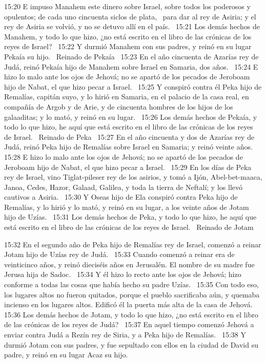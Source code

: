 15:20 E impuso Manahem este dinero sobre Israel, sobre todos los poderosos y opulentos; de cada uno cincuenta siclos de plata,  para dar al rey de Asiria; y el rey de Asiria se volvió, y no se detuvo allí en el país.  
15:21 Los demás hechos de Manahem, y todo lo que hizo, ¿no está escrito en el libro de las crónicas de los reyes de Israel?  
15:22 Y durmió Manahem con sus padres, y reinó en su lugar Pekaía su hijo.  
Reinado de Pekaía  
15:23 En el año cincuenta de Azarías rey de Judá, reinó Pekaía hijo de Manahem sobre Israel en Samaria, dos años.  
15:24 E hizo lo malo ante los ojos de Jehová; no se apartó de los pecados de Jeroboam hijo de Nabat, el que hizo pecar a Israel.  
15:25 Y conspiró contra él Peka hijo de Remalías, capitán suyo, y lo hirió en Samaria, en el palacio de la casa real, en compañía de Argob y de Arie, y de cincuenta hombres de los hijos de los galaaditas; y lo mató, y reinó en su lugar.  
15:26 Los demás hechos de Pekaía, y todo lo que hizo, he aquí que está escrito en el libro de las crónicas de los reyes de Israel.  
Reinado de Peka  
15:27 En el año cincuenta y dos de Azarías rey de Judá, reinó Peka hijo de Remalías sobre Israel en Samaria; y reinó veinte años.  
15:28 E hizo lo malo ante los ojos de Jehová; no se apartó de los pecados de Jeroboam hijo de Nabat, el que hizo pecar a Israel.  
15:29 En los días de Peka rey de Israel, vino Tiglat-pileser rey de los asirios, y tomó a Ijón, Abel-bet-maaca, Janoa, Cedes, Hazor, Galaad, Galilea, y toda la tierra de Neftalí; y los llevó cautivos a Asiria.  
15:30 Y Oseas hijo de Ela conspiró contra Peka hijo de Remalías, y lo hirió y lo mató, y reinó en su lugar, a los veinte años de Jotam hijo de Uzías.  
15:31 Los demás hechos de Peka, y todo lo que hizo, he aquí que está escrito en el libro de las crónicas de los reyes de Israel.  
Reinado de Jotam  

15:32 En el segundo año de Peka hijo de Remalías rey de Israel, comenzó a reinar Jotam hijo de Uzías rey de Judá.  
15:33 Cuando comenzó a reinar era de veinticinco años, y reinó dieciséis años en Jerusalén. El nombre de su madre fue Jerusa hija de Sadoc.  
15:34 Y él hizo lo recto ante los ojos de Jehová; hizo conforme a todas las cosas que había hecho su padre Uzías.  
15:35 Con todo eso, los lugares altos no fueron quitados, porque el pueblo sacrificaba aún, y quemaba incienso en los lugares altos. Edificó él la puerta más alta de la casa de Jehová.  
15:36 Los demás hechos de Jotam, y todo lo que hizo, ¿no está escrito en el libro de las crónicas de los reyes de Judá?  
15:37 En aquel tiempo comenzó Jehová a enviar contra Judá a Rezín rey de Siria, y a Peka hijo de Remalías.  
15:38 Y durmió Jotam con sus padres, y fue sepultado con ellos en la ciudad de David su padre, y reinó en su lugar Acaz su hijo.  
